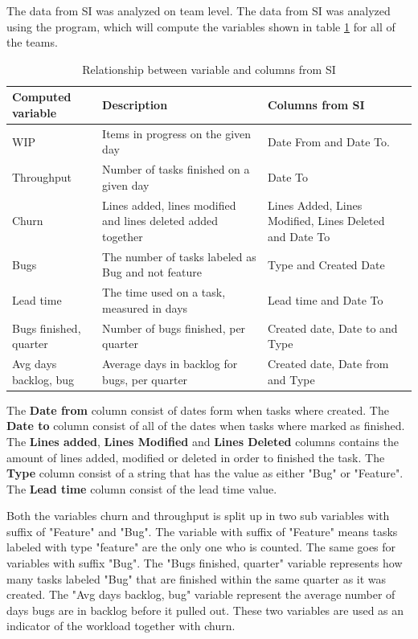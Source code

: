 \documentclass[UKenglish]{ifimaster}  %
\begin{document}
The data from SI was analyzed on team level. The data from SI was analyzed using the program, which will compute the variables shown in table \ref{des} for all of the teams.
\begin{table}[htbp]
\begin{center}
    \begin{tabular}{| l | p{5cm} |  p{5cm} |}
    \hline
    \bf{Computed variable} &	\bf{Description}	 & \bf{Columns from SI}\\ \hline 
     WIP & \parbox[t]{5cm}{Items in progress on the given day} & Date From and Date To. \\ \hline
     Throughput	& Number of tasks finished on a given day & Date To \\ \hline
     Churn & Lines added, lines modified and lines deleted added together & Lines Added, Lines Modified, Lines Deleted and Date To \\ \hline
    Bugs & The number of tasks labeled as Bug and not feature & Type and Created Date \\ \hline
    Lead time & The time used on a task, measured in days & Lead time and Date To \\ \hline
    Bugs finished, quarter & Number of bugs finished, per quarter &Created date, Date to and Type \\ \hline
    Avg days backlog, bug & Average days in backlog for bugs, per quarter & Created date, Date from and Type \\ \hline
  \end{tabular}
\caption{Relationship between variable and columns from SI}
\label{des} %
\end{center}
\end{table}
\newpage
The \textbf{Date from} column consist of dates form when tasks where created. 
The \textbf{Date to} column consist of all of the dates when tasks where marked as finished.
The \textbf{Lines added}, \textbf{Lines Modified} and \textbf{Lines Deleted} columns contains the amount of lines added, modified or deleted in order to finished the task.
The \textbf{Type} column consist of a string that has the value as either "Bug" or "Feature".
The \textbf{Lead time} column consist of the lead time value. 
 
Both the variables churn and throughput is split up in two sub variables with suffix of "Feature" and "Bug". The variable with suffix of "Feature" means tasks labeled with type "feature" are the only one who is counted. The same goes for variables with suffix "Bug". The "Bugs finished, quarter" variable represents how many tasks labeled "Bug" that are finished within the same quarter as it was created.  The "Avg days backlog, bug" variable represent the average number of days bugs are in backlog before it pulled out. These two variables are used as an indicator of the workload together with churn.   
\end{document}
